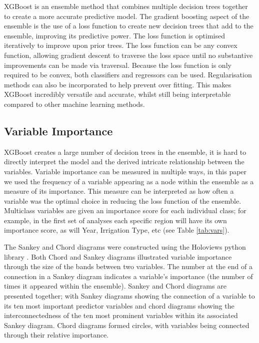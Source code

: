 \documentclass[review,12pt,authoryear]{elsarticle}
\begin{document}
\begin{linenumbers}
\par
XGBoost is an ensemble method that combines multiple decision trees together to create a more accurate predictive model. The gradient boosting aspect of the ensemble is the use of a loss function to create new decision trees that add to the ensemble, improving its predictive power. The loss function is optimised iteratively to improve upon prior trees. The loss function can be any convex function, allowing gradient descent to traverse the loss space until no substantive improvements can be made via traversal. Because the loss function is only required to be convex, both classifiers and regressors can be used. Regularisation methods can also be incorporated to help prevent over fitting. This makes XGBoost incredibly versatile and accurate, whilst still being interpretable compared to other machine learning methods.
\subsection{Variable Importance}\label{sec:importance}
XGBoost creates a large number of decision trees in the ensemble, it is hard to directly interpret the model and the derived intricate relationship between the variables. Variable importance can be measured in multiple ways, in this paper we used the frequency of a variable appearing as a node within the ensemble as a measure of its importance. This measure can be interpreted as how often a variable was the optimal choice in reducing the loss function of the ensemble. Multiclass variables are given an importance score for each individual class;  for example, in the first set of analyses each specific region will have its own importance score, as will Year, Irrigation Type, etc (see Table \ref{tab:vars}).
\par
The Sankey and Chord diagrams were constructed using the Holoviews python library \citep{philipp_rudiger_2020_3904606}. Both Chord and Sankey diagrams illustrated variable importance through the size of the bands between two variables. The number at the end of a connection in a Sankey diagram indicates a variable's importance (the number of times it appeared within the ensemble). Sankey and Chord diagrams are presented together; with Sankey diagrams showing the connection of a variable to its ten most important predictor variables and chord diagrams showing the interconnectedness of the ten most prominent variables within its associated Sankey diagram. Chord diagrams formed circles, with variables being connected through their relative importance.


\end{linenumbers}
\end{document}
